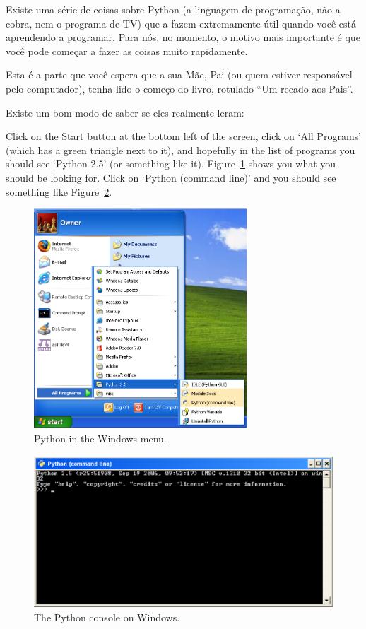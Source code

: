Existe uma série de coisas sobre Python (a linguagem de programação, não a cobra, nem o programa de TV) que a fazem extremamente útil quando você está aprendendo a programar. Para nós, no momento, o motivo mais importante é que você pode começar a fazer as coisas muito rapidamente.

Esta é a parte que você espera que a sua Mãe, Pai (ou quem estiver responsável pelo computador), tenha lido o começo do livro, rotulado ``Um recado aos Pais''.

\noindent
Existe um bom modo de saber se eles realmente leram:

\begin{WINDOWS}
Click on the Start button at the bottom left of the screen, click on `All Programs' (which has a green triangle next to it), and hopefully in the list of programs you should see `Python 2.5' (or something like it).  Figure~\ref{fig1} shows you what you should be looking for. Click on `Python (command line)' and you should see something like Figure~\ref{fig2}.

\begin{figure}
\begin{center}
\includegraphics[width=80mm]{eps/figure1.eps}
\end{center}
\caption{Python in the Windows menu.}\label{fig1}
\end{figure}

\begin{figure}
\begin{center}
\includegraphics[width=135mm]{eps/figure2.eps}
\end{center}
\caption{The Python console on Windows.}\label{fig2}
\end{figure}
\end{WINDOWS}

